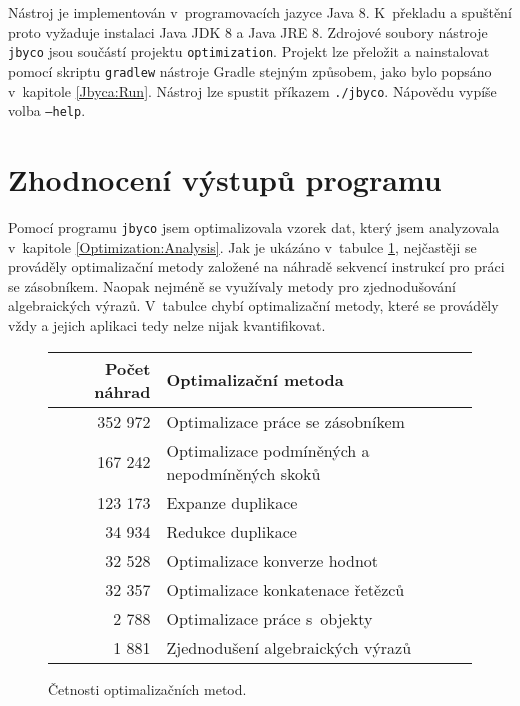 Nástroj je implementován v~programovacích jazyce Java 8. K~překladu a spuštění proto vyžaduje instalaci Java JDK 8 a Java JRE 8. Zdrojové soubory nástroje \texttt{jbyco} jsou součástí projektu \texttt{optimization}. Projekt lze přeložit a nainstalovat pomocí skriptu \texttt{gradlew} nástroje Gradle stejným způsobem, jako bylo popsáno v~kapitole \ref{Jbyca:Run}. Nástroj lze spustit příkazem \texttt{./jbyco}. Nápovědu vypíše volba \texttt{---help}.


\section{Zhodnocení výstupů programu}\label{Jbyco:Results}

Pomocí programu \texttt{jbyco} jsem optimalizovala vzorek dat, který jsem analyzovala v~kapitole \ref{Optimization:Analysis}. Jak je ukázáno v~tabulce \ref{tab:methods}, nejčastěji se prováděly optimalizační metody založené na náhradě sekvencí instrukcí pro práci se zásobníkem. Naopak nejméně se využívaly metody pro zjednodušování algebraických výrazů. V~tabulce chybí optimalizační metody, které se prováděly vždy a jejich aplikaci tedy nelze nijak kvantifikovat.

\begin{figure}
\begin{center}
  \begin{tabular}{r l} \hline
  \textbf{Počet náhrad} & \textbf{Optimalizační metoda} \\\hline

352 972	&	Optimalizace práce se zásobníkem	\\
167 242	&	Optimalizace podmíněných a nepodmíněných skoků	\\
123 173	&	Expanze duplikace	\\
34 934	&	Redukce duplikace	\\
32 528	&	Optimalizace konverze hodnot	\\
32 357	&	Optimalizace konkatenace řetězců	\\
2 788	&	Optimalizace práce s~objekty	\\
1 881	&	Zjednodušení algebraických výrazů	\\\hline

  \end{tabular}
\end{center}
\caption{Četnosti optimalizačních metod.}
\label{tab:methods}
\end{figure}

